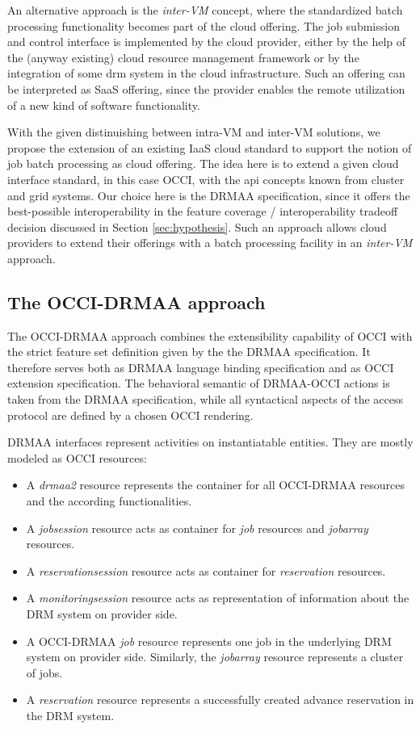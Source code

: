 \documentclass[twocolumn]{svjour3}       %
\begin{document}
An alternative approach is the \emph{inter-VM} concept, where the standardized batch processing functionality becomes part of the cloud offering. The job submission and control interface is implemented by the cloud provider, either by the help of the (anyway existing) cloud resource management framework or by the integration of some \gls{drm} system in the cloud infrastructure. Such an offering can be interpreted as SaaS offering, since the provider enables the remote utilization of a new kind of software functionality.

With the given distinuishing between intra-VM and inter-VM solutions, we propose the extension of an existing IaaS cloud standard to support the notion of job batch processing as cloud offering. The idea here is to extend a given cloud interface standard, in this case OCCI, with the \gls{api} concepts known from cluster and grid systems. Our choice here is the DRMAA specification, since it offers the best-possible interoperability in the feature coverage / interoperability tradeoff decision discussed in Section \ref{sec:hypothesis}. Such an approach allows cloud providers to extend their offerings with a batch processing facility in an \emph{inter-VM} approach.

\subsection{The OCCI-DRMAA approach}
\label{sec:occidrmaa}

The OCCI-DRMAA approach combines the extensibility capability of OCCI with the strict feature set definition given by the the DRMAA specification. It therefore serves both as DRMAA language binding specification and as OCCI extension specification. The behavioral semantic of DRMAA-OCCI actions is taken from the DRMAA specification, while all syntactical aspects of the access protocol are defined by a chosen OCCI rendering.

DRMAA interfaces represent activities on instantiatable entities. They are mostly modeled as OCCI resources:

\begin{itemize}
\item A \emph{drmaa2} resource represents the container for all OCCI-DRMAA resources and the according functionalities. 
\item A \emph{jobsession} resource acts as container for \emph{job} resources and \emph{jobarray} resources. 
\item A \emph{reservationsession} resource acts as container for \emph{reservation} resources. 
\item A \emph{monitoringsession} resource acts as representation of information about the DRM system on provider side. 
\item A OCCI-DRMAA \emph{job} resource represents one job in the underlying DRM system on provider side. Similarly, the \emph{jobarray} resource represents a cluster of jobs.
\item A \emph{reservation} resource represents a successfully created advance reservation in the DRM system.
\end{itemize}
\end{document}
